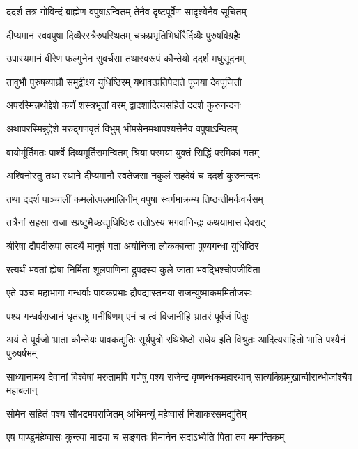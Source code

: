 \twolineshloka
{ददर्श तत्र गोविन्दं ब्राह्मेण वपुषाऽन्वितम्}
{तेनैव दृष्टपूर्वेण सादृश्येनैव सूचितम्}


\twolineshloka
{दीप्यमानं स्ववपुषा दिव्यैरस्त्रैरुपस्थितम्}
{चक्रप्रभृतिभिर्घोरैर्दिव्यैः पुरुषविग्रहैः}


\twolineshloka
{उपास्यमानं वीरेण फल्गुनेन सुवर्चसा}
{तथास्वरूपं कौन्तेयो ददर्श मधुसूदनम्}


\twolineshloka
{तावुभौ पुरुषव्याघ्रौ समुद्वीक्ष्य युधिष्ठिरम्}
{यथावत्प्रतिपेदाते पूजया देवपूजितौ}


\twolineshloka
{अपरस्मिन्नथोद्देशे कर्णं शस्त्रभृतां वरम्}
{द्वादशादित्यसहितं ददर्श कुरुनन्दनः}


\twolineshloka
{अथापरस्मिन्नुद्देशे मरुद्गणवृतं विभुम्}
{भीमसेनमथापश्यत्तेनैव वपुषाऽन्वितम्}


\twolineshloka
{वायोर्मूर्तिमतः पार्श्वे दिव्यमूर्तिसमन्वितम्}
{श्रिया परमया युक्तं सिद्धिं परमिकां गतम्}


\twolineshloka
{अश्विनोस्तु तथा स्थाने दीप्यमानौ स्वतेजसा}
{नकुलं सहदेवं च ददर्श कुरुनन्दनः}


\twolineshloka
{तथा ददर्श पाञ्चालीं कमलोत्पलमालिनीम्}
{वपुषा स्वर्गमाक्रम्य तिष्ठन्तीमर्कवर्चसम्}


\twolineshloka
{तत्रैनां सहसा राजा स्प्रष्टुमैच्छद्युधिष्ठिरः}
{ततोऽस्य भगवानिन्द्रः कथयामास देवराट्}


\twolineshloka
{श्रीरेषा द्रौपदीरूपा त्वदर्थे मानुषं गता}
{अयोनिजा लोककान्ता पुण्यगन्धा युधिष्ठिर}


\twolineshloka
{रत्यर्थं भवतां ह्येषा निर्मिता शूलपाणिना}
{द्रुपदस्य कुले जाता भवद्भिश्चोपजीविता}


\twolineshloka
{एते पञ्च महाभागा गन्धर्वाः पावकप्रभाः}
{द्रौपद्यास्तनया राजन्युष्माकममितौजसः}


\twolineshloka
{पश्य गन्धर्वराजानं धृतराष्ट्रं मनीषिणम्}
{एनं च त्वं विजानीहि भ्रातरं पूर्वजं पितुः}


\threelineshloka
{अयं ते पूर्वजो भ्राता कौन्तेयः पावकद्युतिः}
{सूर्यपुत्रो रथिश्रेष्ठो राधेय इति विश्रुतः}
{आदित्यसहितो भाति पश्यैनं पुरुषर्षभम्}


\threelineshloka
{साध्यानामथ देवानां विश्वेषां मरुतामपि}
{गणेषु पश्य राजेन्द्र वृष्णन्धकमहारथान्}
{सात्यकिप्रमुखान्वीरान्भोजांश्चैव महाबलान्}


\twolineshloka
{सोमेन सहितं पश्य सौभद्रमपराजितम्}
{अभिमन्युं महेष्वासं निशाकरसमद्युतिम्}


\twolineshloka
{एष पाण्डुर्महेष्वासः कुन्त्या माद्र्या च सङ्गतः}
{विमानेन सदाऽभ्येति पिता तव ममान्तिकम्}


